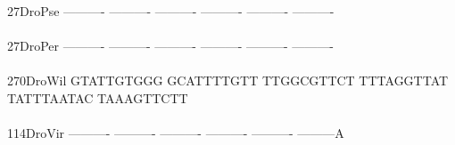 \documentclass[11pt,twoside,reqno,a4paper]{article}
\begin{document}
{27\hspace*{3\charwidth}DroPse	----------	----------	----------	----------	----------	----------	\\
\hspace*{5\charwidth}\hspace*{7\charwidth}\hspace*{1\charwidth}\hspace*{1\charwidth}\hspace*{1\charwidth}\hspace*{1\charwidth}\hspace*{1\charwidth}\hspace*{1\charwidth}\\
27\hspace*{3\charwidth}DroPer	----------	----------	----------	----------	----------	----------	\\
\hspace*{5\charwidth}\hspace*{7\charwidth}\hspace*{1\charwidth}\hspace*{1\charwidth}\hspace*{1\charwidth}\hspace*{1\charwidth}\hspace*{1\charwidth}\hspace*{1\charwidth}\\
270\hspace*{2\charwidth}DroWil	GTATTGTGGG	GCATTTTGTT	TTGGCGTTCT	TTTAGGTTAT	TATTTAATAC	TAAAGTTCTT	\\
\hspace*{5\charwidth}\hspace*{7\charwidth}\hspace*{1\charwidth}\hspace*{1\charwidth}\hspace*{1\charwidth}\hspace*{1\charwidth}\hspace*{1\charwidth}\hspace*{1\charwidth}\\
114\hspace*{2\charwidth}DroVir	----------	----------	----------	----------	----------	---------A	\\
\hspace*{5\charwidth}\hspace*{7\charwidth}\hspace*{1\charwidth}\hspace*{1\charwidth}\hspace*{1\charwidth}\hspace*{1\charwidth}\hspace*{1\charwidth}\hspace*{1\charwidth}\\
}
\end{document}
